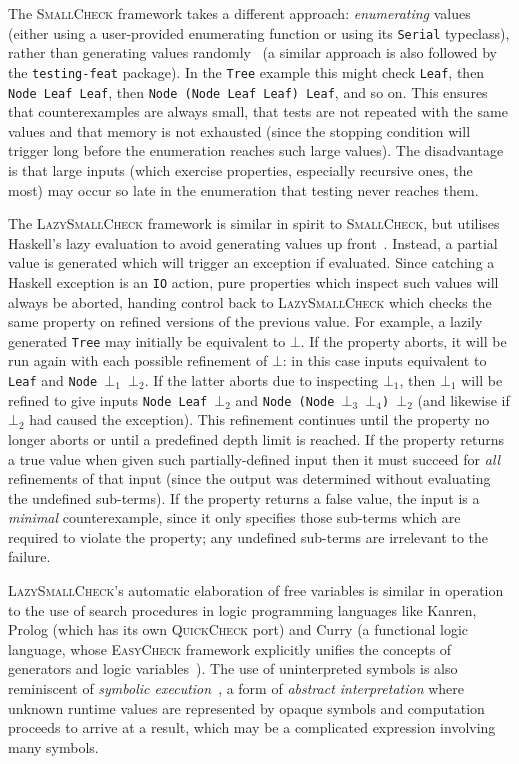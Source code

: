 The \textsc{SmallCheck} framework takes a different approach: \emph{enumerating}
values (either using a user-provided enumerating function or using its
\texttt{Serial} typeclass), rather than generating values
randomly~\cite{runciman2008smallcheck} (a similar approach is also followed by
the \texttt{testing-feat} package). In the \texttt{Tree} example this might
check \texttt{Leaf}, then \texttt{Node Leaf Leaf}, then
\texttt{Node (Node Leaf Leaf) Leaf}, and so on. This ensures that
counterexamples are always small, that tests are not repeated with the same
values and that memory is not exhausted (since the stopping condition will
trigger long before the enumeration reaches such large values). The disadvantage
is that large inputs (which exercise properties, especially recursive ones, the
most) may occur so late in the enumeration that testing never reaches them.

The \textsc{LazySmallCheck} framework is similar in spirit to
\textsc{SmallCheck}, but utilises Haskell's lazy evaluation to avoid generating
values up front~\cite{reich2013advances}. Instead, a partial value is generated
which will trigger an exception if evaluated. Since catching a Haskell exception
is an \texttt{IO} action, pure properties which inspect such values will always
be aborted, handing control back to \textsc{LazySmallCheck} which checks the
same property on refined versions of the previous value. For example, a lazily
generated \texttt{Tree} may initially be equivalent to $\bot$. If the property
aborts, it will be run again with each possible refinement of $\bot$: in this
case inputs equivalent to \texttt{Leaf} and \texttt{Node~$\bot_1$~$\bot_2$}. If
the latter aborts due to inspecting $\bot_1$, then $\bot_1$ will be refined to
give inputs \texttt{Node~Leaf~$\bot_2$} and
\texttt{Node~(Node~$\bot_3$~$\bot_4$)~$\bot_2$} (and likewise if $\bot_2$ had
caused the exception). This refinement continues until the property no longer
aborts or until a predefined depth limit is reached. If the property returns a
true value when given such partially-defined input then it must succeed for
\emph{all} refinements of that input (since the output was determined without
evaluating the undefined sub-terms). If the property returns a false value, the
input is a \emph{minimal} counterexample, since it only specifies those
sub-terms which are required to violate the property; any undefined sub-terms
are irrelevant to the failure.

\textsc{LazySmallCheck}'s automatic elaboration of free variables is similar in
operation to the use of search procedures in logic programming languages like
Kanren, Prolog (which has its own \textsc{QuickCheck} port) and Curry (a
functional logic language, whose \textsc{EasyCheck} framework explicitly
unifies the concepts of generators and logic
variables~\cite{christiansen2008easycheck}). The use of uninterpreted symbols
is also reminiscent of \emph{symbolic execution}~\cite{king1976symbolic}, a form
of \emph{abstract interpretation} where unknown runtime values are represented
by opaque symbols and computation proceeds to arrive at a result, which may be a
complicated expression involving many symbols.
